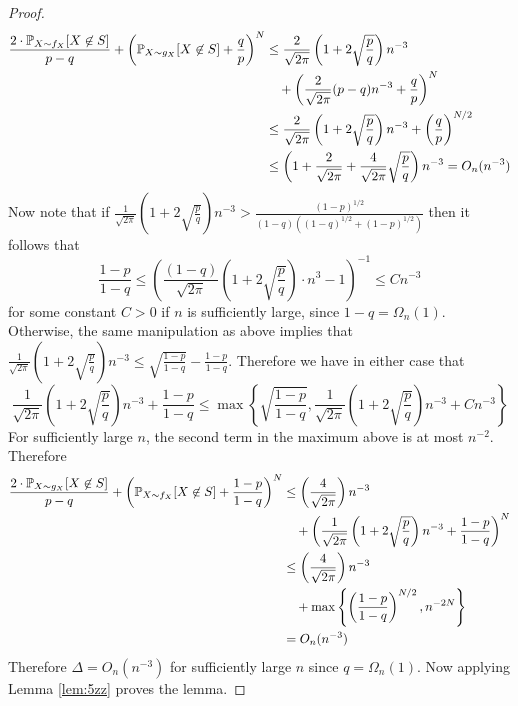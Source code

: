 \begin{proof}
\begin{align*}
\frac{2 \cdot \mathbb{P}_{X \sim f_X} [X \not \in S]}{p - q} + \left( \mathbb{P}_{X \sim g_X}[X \not \in S] + \frac{q}{p} \right)^{N} &\le \frac{2}{\sqrt{2\pi}} \left( 1 + 2\sqrt{\frac{p}{q}} \right)n^{-3} \\
&\quad+ \left( \frac{2}{\sqrt{2\pi}} (p - q) n^{-3} + \frac{q}{p} \right)^N \\
&\le \frac{2}{\sqrt{2\pi}} \left( 1 + 2\sqrt{\frac{p}{q}} \right)n^{-3} + \left( \frac{q}{p} \right)^{N/2} \\
&\le \left( 1 + \frac{2}{\sqrt{2\pi}} + \frac{4}{\sqrt{2\pi}} \sqrt{\frac{p}{q}} \right)n^{-3} = O_n(n^{-3})
\end{align*}
Now note that if $\frac{1}{\sqrt{2\pi}} \left( 1 + 2\sqrt{\frac{p}{q}} \right) n^{-3} > \frac{(1 - p)^{1/2}}{(1 - q)((1 - q)^{1/2} + (1 - p)^{1/2})}$ then it follows that
$$\frac{1 - p}{1 - q} \le \left( \frac{(1 - q)}{\sqrt{2\pi}} \left( 1 + 2\sqrt{\frac{p}{q}} \right) \cdot n^3 - 1 \right)^{-1} \le Cn^{-3}$$
for some constant $C > 0$ if $n$ is sufficiently large, since $1 - q = \Omega_n(1)$. Otherwise, the same manipulation as above implies that $\frac{1}{\sqrt{2\pi}} \left( 1 + 2\sqrt{\frac{p}{q}} \right) n^{-3} \le \sqrt{\frac{1 - p}{1 - q}} - \frac{1 - p}{1 - q}$. Therefore we have in either case that
$$\frac{1}{\sqrt{2\pi}} \left( 1 + 2\sqrt{\frac{p}{q}} \right) n^{-3} + \frac{1 - p}{1 - q} \le \max \left\{ \sqrt{\frac{1 - p}{1 - q}}, \frac{1}{\sqrt{2\pi}} \left( 1 + 2\sqrt{\frac{p}{q}} \right) n^{-3} +Cn^{-3} \right\}$$
For sufficiently large $n$, the second term in the maximum above is at most $n^{-2}$. Therefore
\begin{align*}
\frac{2 \cdot \mathbb{P}_{X \sim g_X} [X \not \in S]}{p - q} + \left( \mathbb{P}_{X \sim f_X}[X \not \in S] + \frac{1 - p}{1 - q}\right)^{N} &\le \left( \frac{4}{\sqrt{2\pi}} \right) n^{-3} \\
&\quad+ \left( \frac{1}{\sqrt{2\pi}} \left( 1 + 2\sqrt{\frac{p}{q}} \right) n^{-3} + \frac{1 - p}{1 - q} \right)^N \\
&\le \left( \frac{4}{\sqrt{2\pi}} \right) n^{-3} \\
&\quad+ \max \left\{ \left( \frac{1 - p}{1 - q} \right)^{N/2}, n^{-2N} \right\} \\
&= O_n(n^{-3})
\end{align*}
Therefore $\Delta = O_n(n^{-3})$ for sufficiently large $n$ since $q = \Omega_n(1)$. Now applying Lemma \ref{lem:5zz} proves the lemma.
\end{proof}

